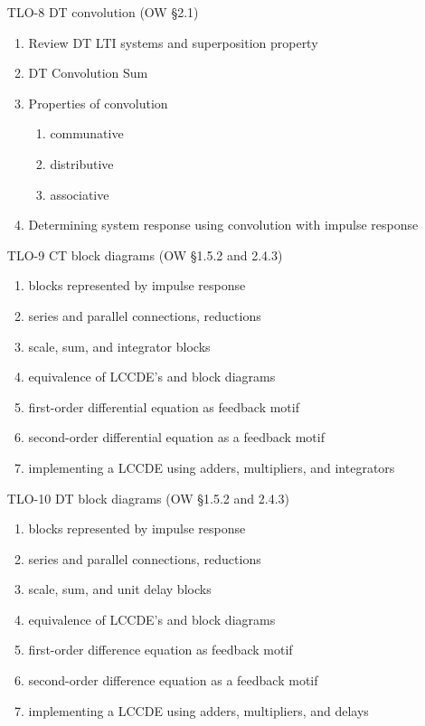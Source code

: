 \begin{enumerate}
\item[TLO-8] DT convolution (OW \S 2.1)
  \begin{enumerate}
  \item Review DT LTI systems and superposition property
  \item DT Convolution Sum
  \item Properties of convolution
    \begin{enumerate}
    \item communative 
    \item distributive
    \item associative
    \end{enumerate}
  \item Determining system response using convolution with impulse response
  \end{enumerate}
  
\item[TLO-9] CT block diagrams (OW \S 1.5.2 and 2.4.3)
  \begin{enumerate}
  \item blocks represented by impulse response
  \item series and parallel connections, reductions
  \item scale, sum, and integrator blocks
  \item equivalence of LCCDE's and block diagrams
  \item first-order differential equation as feedback motif
  \item second-order differential equation as a feedback motif
  \item implementing a LCCDE using adders, multipliers, and integrators
  \end{enumerate}

\item[TLO-10] DT block diagrams (OW \S 1.5.2 and 2.4.3)
  \begin{enumerate}
  \item blocks represented by impulse response
  \item series and parallel connections, reductions
  \item scale, sum, and unit delay blocks
  \item equivalence of LCCDE's and block diagrams
  \item first-order difference equation as feedback motif
  \item second-order difference equation as a feedback motif
  \item implementing a LCCDE using adders, multipliers, and delays
  \end{enumerate}


\end{enumerate}

